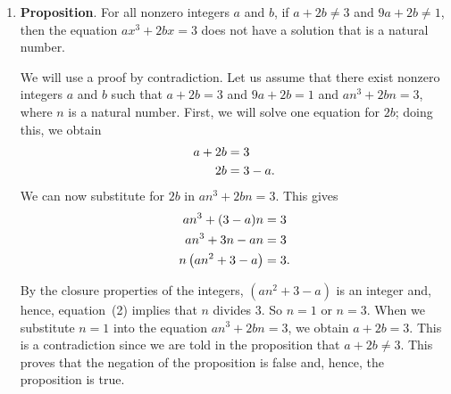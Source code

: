 \begin{enumerate}
\begin{enumerate}
\item \textbf{Proposition}. For all nonzero integers $a$ and $b$, if $a + 2b \ne 3$ and 
$9a + 2b \ne 1$, then the equation $ax^3 + 2bx = 3$ does not have a solution that is a natural number.

\setcounter{equation}{0}
\begin{myproof}
We will use a proof by contradiction.  Let us assume that there exist nonzero integers $a$ and 
$b$ such that $a + 2b = 3$ and $9a + 2b = 1$ and $an^3 + 2bn = 3$, where $n$ is a natural number.  First, we will solve one equation for $2b$; doing this, we obtain
\begin{align}
a + 2b &= 3 \notag \\
    2b &= 3 - a.
\end{align}
We can now substitute for $2b$ in $an^3 + 2bn = 3$.  This gives
\begin{align}
an^3 + (3 - a)n &= 3 \notag \\
an^3 + 3n - an  &= 3 \notag \\
n \left( an^2 + 3 - a \right) &= 3.
\end{align}

By the closure properties of the integers, $\left( an^2 + 3 - a \right)$ is an integer and, hence, equation~(2) implies that $n$ divides 3.  So $n = 1$ or $n = 3$.  When we substitute 
$n = 1$ into the equation $an^3 + 2bn = 3$, we obtain $a + 2b = 3$.  This is a contradiction since we are told in the proposition that $a + 2b \ne 3$.  This proves that the negation of the proposition is false and, hence, the proposition is true.
\end{myproof}
\end{enumerate}
\end{enumerate}


